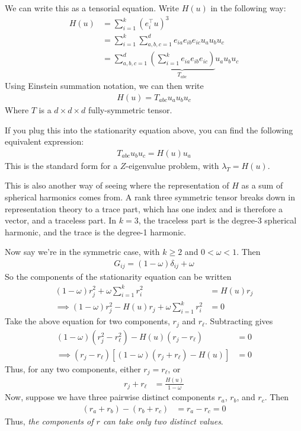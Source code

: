 \documentclass[11pt, reqno]{amsart}
\theoremstyle{notestyle}
\theoremstyle{defstyle}
\begin{document}
We can write this as a tensorial equation.
Write $H(u)$ in the following way:
\begin{align*}
    H(u)
    &= \sum_{i=1}^k (e_i^\top u)^3 \\
    &= \sum_{i=1}^k \sum_{a,b,c=1}^d e_{ia} e_{ib} e_{ic} u_a u_b u_c \\
    &= \sum_{a,b,c=1}^d
    \underbrace{\left(\sum_{i=1}^k e_{ia} e_{ib} e_{ic}\right)}_{T_{abc}} 
    u_a u_b u_c
\end{align*}
Using Einstein summation notation, we can then write
\begin{align*}
    H(u) = T_{abc} u_a u_b u_c
\end{align*}
Where $T$ is a $d \times d \times d$ fully-symmetric tensor.

If you plug this into the stationarity equation above, you can find the following equivalent expression:
\begin{align*}
    \boxed{T_{abc} u_b u_c = H(u) u_a}
\end{align*}
This is the standard form for a $Z$-eigenvalue problem, with $\lambda_T = H(u)$.

This is also another way of seeing where the representation of $H$ as a sum of spherical harmonics comes from.
A rank three symmetric tensor breaks down in representation theory to a trace part, which has one index and is therefore a vector, and a traceless part.
In $k=3$, the traceless part is the degree-3 spherical harmonic, and the trace is the degree-1 harmonic.

Now say we're in the symmetric case, with $k\geq2$ and $0<\omega<1$.
Then
\begin{align*}
    G_{ij} = (1-\omega)\delta_{ij} + \omega
\end{align*}
So the components of the stationarity equation can be written
\begin{align*}
    (1-\omega)r_j^2
    + \omega \sum_{i=1}^k r_i^2
    &= H(u) r_j \\
    \implies
    (1-\omega)r_j^2
    - H(u) r_j
    + \omega \sum_{i=1}^k r_i^2 
    &= 0
\end{align*}
Take the above equation for two components, $r_j$ and $r_\ell$.
Subtracting gives
\begin{align*}
    (1-\omega)(r_j^2 - r_\ell^2)
    - H(u) (r_j - r_\ell)
    &= 0 \\
    \implies
    (r_j - r_\ell)
    [(1-\omega)(r_j + r_\ell) - H(u)]
    &= 0
\end{align*}
Thus, for any two components, either $r_j = r_\ell$, or
\begin{align*}
    r_j + r_\ell
    &= \frac{H(u)}{1-\omega}
\end{align*}
Now, suppose we have three pairwise distinct components $r_a$, $r_b$, and $r_c$.
Then
\begin{align*}
    (r_a + r_b)
    - (r_b + r_c)
    &= r_a - r_c = 0
\end{align*}
Thus, \emph{the components of $r$ can take only two distinct values}.
\end{document}
